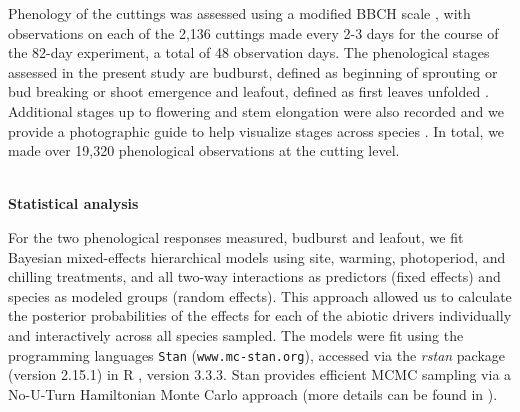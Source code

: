 \documentclass[11pt]{article}
\begin{document}
Phenology of the cuttings was assessed using a modified BBCH scale \citep{Finn:2007}, with observations on each of the 2,136 cuttings made every 2-3 days for the course of the 82-day experiment, a total of 48 observation days. The phenological stages assessed in the present study are budburst, defined as beginning of sprouting or bud breaking or shoot emergence \citep[Code 07 in][]{Finn:2007} and leafout, defined as first leaves unfolded \citep[Code 11 in][]{Finn:2007}. Additional stages up to flowering and stem elongation were also recorded and we provide a photographic guide to help visualize stages across species \citep{bbchguide}. In total, we made over 19,320 phenological observations at the cutting level.
%

\vspace{1ex}\\
\noindent \textbf{Statistical analysis}

\noindent For the two phenological responses measured, budburst and leafout, we fit Bayesian mixed-effects hierarchical models using site, warming, photoperiod, and chilling treatments, and all two-way interactions as predictors (fixed effects) and species as modeled groups (random effects). This approach allowed us to calculate the posterior probabilities of the effects for each of the abiotic drivers individually and interactively across all species sampled. The models were fit using the programming languages \texttt{Stan} \citep{Carpenter:2016aa}(\texttt{www.mc-stan.org}), accessed via the \textit{rstan} package (version 2.15.1) in R \citep{Rcore:2017}, version 3.3.3. Stan provides efficient MCMC sampling via a No-U-Turn Hamiltonian Monte Carlo approach (more details can be found in \citet{BDA,Carpenter:2016aa}).
\end{document}
